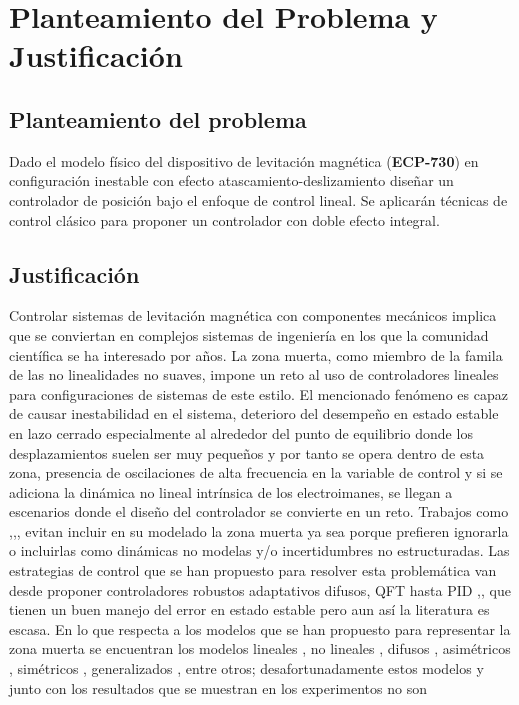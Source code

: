 \chapter{Planteamiento del Problema y Justificación}
\section{Planteamiento del problema}
Dado el modelo físico del dispositivo de levitación magnética (\textbf{ECP-730}) en configuración inestable con efecto atascamiento-deslizamiento 
diseñar un controlador de posición bajo el enfoque de control lineal.
Se aplicarán técnicas de control clásico para proponer un controlador con doble efecto integral. 

\section{Justificación}
Controlar sistemas de levitación magnética con componentes mecánicos implica que se conviertan en complejos sistemas de ingeniería en los que la comunidad científica se ha interesado por años.
La zona muerta, como miembro de la famila de las no linealidades no suaves, impone un reto
al uso de controladores lineales para configuraciones de sistemas de este estilo. El mencionado fenómeno es capaz de causar inestabilidad en el sistema, 
deterioro del desempeño en estado estable en lazo cerrado especialmente al alrededor del punto de equilibrio donde los desplazamientos suelen ser muy pequeños
y por tanto se opera dentro de esta zona, presencia de oscilaciones de alta 
frecuencia en la variable de control y si se adiciona la dinámica no lineal intrínsica de los electroimanes,
se llegan a escenarios donde el diseño del controlador se convierte en un reto. Trabajos como \cite{khimani},\cite{mukesh},\cite{neelma}, evitan incluir en su modelado
la zona muerta ya sea porque prefieren ignorarla o incluirlas como dinámicas no modelas y/o incertidumbres no estructuradas. Las estrategias de control que se han propuesto para resolver 
esta problemática van desde proponer controladores robustos adaptativos difusos, QFT hasta PID \cite{kuo1},\cite{mukesh},\cite{maaz} que tienen un buen manejo del error en estado estable
pero aun así la literatura es escasa. En lo que respecta a los modelos que se han propuesto para representar la zona muerta se encuentran los modelos lineales \cite{salim}, no lineales \cite{huanqing}, difusos \cite{zhi},
 asimétricos \cite{gang}, simétricos \cite{nizar}, generalizados \cite{guanyu}, entre otros; desafortunadamente estos modelos y junto con los resultados que se muestran en los experimentos no son 
